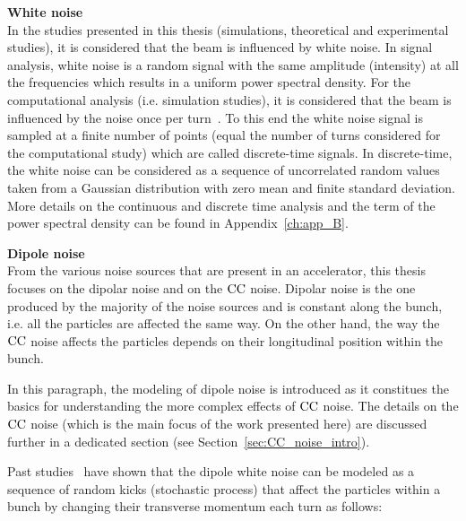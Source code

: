 \textbf{White noise}\\
In the studies presented in this thesis (simulations, theoretical and experimental studies), it is considered that the beam is influenced by white noise. In signal analysis, white noise is a random signal with the same amplitude (intensity) at all the frequencies which results in a uniform power spectral density. For the computational analysis (i.e. simulation studies), it is considered that the beam is influenced by the noise once per turn~\cite{Lebedev:248620, Lebedev:248622, PhysRevSTAB.18.101001}. To this end the white noise signal is sampled at a finite number of points (equal the number of turns considered for the computational study) which are called discrete-time signals. In discrete-time, the white noise can be considered as a sequence of uncorrelated random values taken from a Gaussian distribution with zero mean and finite standard deviation. More details on the continuous and discrete time analysis and the term of the power spectral density can be found in Appendix~\ref{ch:app_B}. %



\textbf{Dipole noise}\\
From the various noise sources that are present in an accelerator, this thesis focuses on the dipolar noise and on the ${\mathrm{CC}}$ noise. Dipolar noise is the one produced by the majority of the noise sources and is constant along the bunch, i.e. all the particles are affected the same way. %
On the other hand, the way the ${\mathrm{CC}}$ noise affects the particles depends on their longitudinal position within the bunch. 

In this paragraph, the modeling of dipole noise is introduced as it constitues the basics for understanding the more complex effects of ${\mathrm{CC}}$ noise. The details on the ${\mathrm{CC}}$ noise (which is the main focus of the work presented here) are discussed further in a dedicated section (see Section~\ref{sec:CC_noise_intro}). 

Past studies~\cite{Lebedev:248620, Lebedev:248622} have shown that the dipole white noise can be modeled as a sequence of random kicks (stochastic process) that affect the particles within a bunch by changing their transverse momentum each turn as follows:

